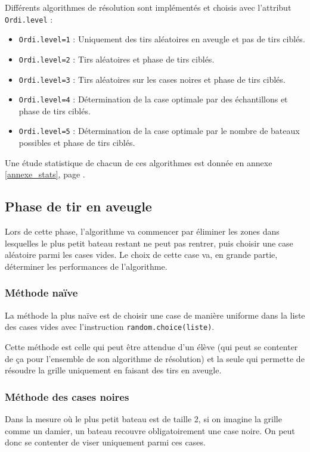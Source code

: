 Différents algorithmes de résolution sont implémentés et choisis avec l'attribut \texttt{Ordi.level} :
\begin{itemize}
\item \texttt{Ordi.level=1} : Uniquement des tirs aléatoires en aveugle et pas de tirs ciblés.
\item \texttt{Ordi.level=2} : Tirs aléatoires et phase de tirs ciblés.
\item \texttt{Ordi.level=3} : Tirs aléatoires sur les cases noires  et phase de tirs ciblés.
\item \texttt{Ordi.level=4} : Détermination de la case optimale par des échantillons et phase de tirs ciblés.
\item \texttt{Ordi.level=5} : Détermination de la case optimale par le nombre de bateaux possibles et phase de tirs ciblés.
\end{itemize}

Une étude statistique de chacun de ces algorithmes est donnée en annexe \ref{annexe_stats}, page \pageref{annexe_stats}.





\subsection{Phase de tir en aveugle}
Lors de cette phase, l'algorithme va commencer par éliminer les zones dans lesquelles le plus petit bateau restant ne peut pas rentrer, puis choisir une case aléatoire parmi les cases vides. Le choix de cette case va, en grande partie, déterminer les performances de l'algorithme.

\subsubsection{Méthode naïve}
La méthode la plus naïve est de choisir une case de manière uniforme dans la liste des cases vides avec l'instruction \texttt{random.choice(liste)}.

Cette méthode est celle qui peut être attendue d'un élève (qui peut se contenter de ça pour l'ensemble de son algorithme de résolution) et la seule qui permette de résoudre la grille uniquement en faisant des tirs en aveugle.

\subsubsection{Méthode des cases noires}
Dans la mesure où le plus petit bateau est de taille 2, si on imagine la grille comme un damier, un bateau recouvre obligatoirement une case noire. On peut donc se contenter de viser uniquement parmi ces cases.

